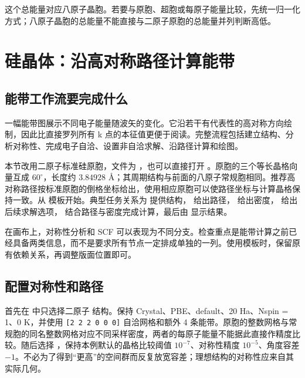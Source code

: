 这个总能量对应八原子晶胞。若要与原胞、超胞或每原子能量比较，先统一归一化方式；八原子晶胞的总能量不能直接与二原子原胞的总能量并列判断高低。

\section{硅晶体：沿高对称路径计算能带}

\subsection{能带工作流要完成什么}

一幅能带图展示不同电子能量随波矢的变化。它沿若干有代表性的高对称方向绘制，因此比直接罗列所有 k 点的本征值更便于阅读。完整流程包括建立结构、分析对称性、完成电子自洽、设置非自洽求解、沿路径计算和绘图。

本节改用二原子标准硅原胞，文件为 ，也可以直接打开 。原胞的三个等长晶格向量互成 $60^\circ$，长度约 $3.84928$ Å；其周期结构与前面的八原子常规胞相同。推荐高对称路径按标准原胞的倒格坐标给出，使用相应原胞可以使路径坐标与计算晶格保持一致。从  模板开始。典型任务关系为  提供结构， 给出路径， 给出密度， 给出后续求解选项， 结合路径与密度完成计算，最后由  显示结果。

在画布上，对称性分析和 SCF 可以表现为不同分支。检查重点是能带计算之前已经具备两类信息，而不是要求所有节点一定排成单独的一列。使用模板时，保留原有依赖关系，再调整版面位置即可。


\subsection{配置对称性和路径}

首先在  中只选择二原子  结构。保持 Crystal、PBE、default、20 Ha、Nspin = 1、0 K，并使用 \mbox{\texttt{[2 2 2 0 0 0]}} 自洽网格和额外 4 条能带。原胞的整数网格与常规胞的同名整数网格对应不同采样密度，两者的每原子能量不能据此直接作精度比较。随后选择 ，保持本例默认的晶格比较阈值 $10^{-7}$、对称性精度 $10^{-5}$、角度容差 $-1$。不必为了得到“更高”的空间群而反复放宽容差；理想结构的对称性应来自其实际几何。

